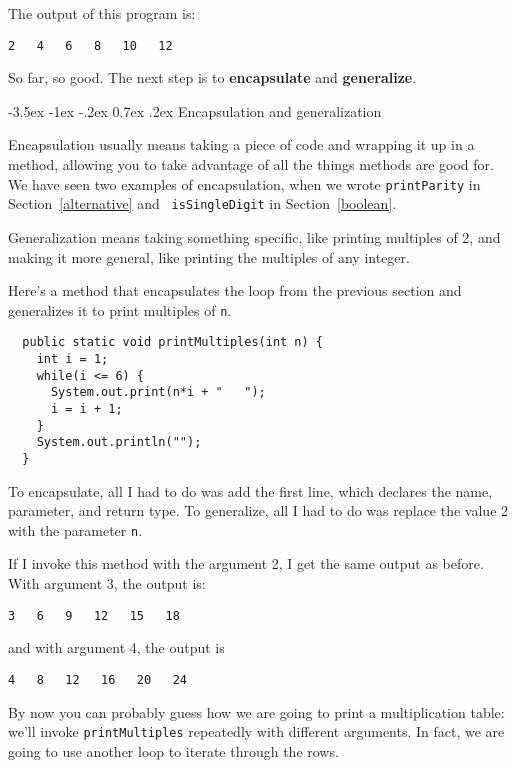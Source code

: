 \documentclass{book}
\makeatletter
\renewcommand{\section}{\@startsection 
    {section} {1} {0mm}%
    {-3.5ex \@plus -1ex \@minus -.2ex}%
    {0.7ex \@plus.2ex}%
    {\normalfont\Large\bfseries}}
\makeatother
\begin{document}
The output of this program is:

\begin{verbatim}
2   4   6   8   10   12
\end{verbatim}
%
So far, so good.  The next step is to {\bf encapsulate} and {\bf
generalize}.

\section {Encapsulation and generalization}
\label{encapsulation}

Encapsulation usually means taking a piece of code and wrapping it up
in a method, allowing you to take advantage of all the things methods
are good for.  We have seen two examples of encapsulation, when we
wrote {\tt printParity} in Section~\ref{alternative} and {\tt
isSingleDigit} in Section~\ref{boolean}.

Generalization means taking something specific, like printing
multiples of 2, and making it more general, like printing the
multiples of any integer.


Here's a method that encapsulates the loop from the previous
section and generalizes it to print multiples of {\tt n}.

\begin{verbatim}
  public static void printMultiples(int n) {
    int i = 1;
    while(i <= 6) {
      System.out.print(n*i + "   ");
      i = i + 1;
    }    
    System.out.println("");
  }
\end{verbatim}
%
To encapsulate, all I had to do was add the first line,
which declares the name, parameter,
and return type.  To generalize, all I had to do was replace
the value 2 with the parameter {\tt n}.

If I invoke this method with the argument 2, I get the same
output as before.  With argument 3, the output is:

\begin{verbatim}
3   6   9   12   15   18
\end{verbatim}
%
and with argument 4, the output is

\begin{verbatim}
4   8   12   16   20   24 
\end{verbatim}
%
By now you can probably guess how we are going to print a
multiplication table: we'll invoke {\tt printMultiples} repeatedly with
different arguments.  In fact, we are going to use another loop to
iterate through the rows.
\end{document}
